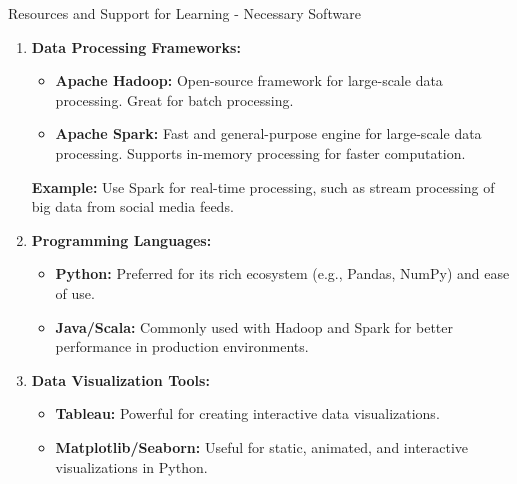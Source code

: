 \documentclass[aspectratio=169]{beamer}
\begin{document}
\begin{frame}[fragile]{Resources and Support for Learning - Necessary Software}
    \begin{enumerate}
        \item \textbf{Data Processing Frameworks:}
            \begin{itemize}
                \item \textbf{Apache Hadoop:} Open-source framework for large-scale data processing. Great for batch processing.
                \item \textbf{Apache Spark:} Fast and general-purpose engine for large-scale data processing. Supports in-memory processing for faster computation.
            \end{itemize}
            \textbf{Example:} Use Spark for real-time processing, such as stream processing of big data from social media feeds.

        \item \textbf{Programming Languages:}
            \begin{itemize}
                \item \textbf{Python:} Preferred for its rich ecosystem (e.g., Pandas, NumPy) and ease of use.
                \item \textbf{Java/Scala:} Commonly used with Hadoop and Spark for better performance in production environments.
            \end{itemize}

        \item \textbf{Data Visualization Tools:}
            \begin{itemize}
                \item \textbf{Tableau:} Powerful for creating interactive data visualizations.
                \item \textbf{Matplotlib/Seaborn:} Useful for static, animated, and interactive visualizations in Python.
            \end{itemize}
    \end{enumerate}
\end{frame}
\end{document}
